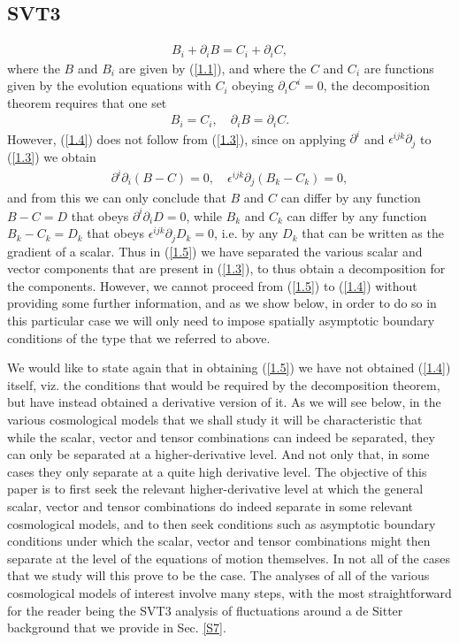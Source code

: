 \subsection{SVT3}
%
\begin{eqnarray}
B_i+\partial_iB=C_i+\partial_iC,
\label{1.3}
\end{eqnarray}
%
where the $B$ and $B_i$ are given by (\ref{1.1}), and where the $C$ and $C_i$ are functions given by the evolution equations with $C_i$ obeying  $\partial_iC^i=0$, the decomposition theorem requires that one set
%
\begin{eqnarray}
B_i= C_i,\quad \partial_iB=\partial_iC.
\label{1.4}
\end{eqnarray}
%
However, (\ref{1.4}) does not follow from (\ref{1.3}), since on applying $\partial^i$ and $\epsilon^{ijk}\partial_j$  to (\ref{1.3}) we obtain 
%
\begin{eqnarray}
\partial^i\partial_i(B-C)=0,\quad \epsilon^{ijk}\partial_j(B_k-C_k)=0,
\label{1.5}
\end{eqnarray}
%
and from this we can only conclude that $B$ and $C$ can differ by any function $B-C=D$ that obeys $\partial^i\partial_iD=0$, while $B_k$ and $C_k$ can differ by any function $B_k-C_k=D_k$ that obeys $\epsilon^{ijk}\partial_jD_k=0$, i.e. by any $D_k$ that can be written as the gradient of a scalar. Thus in (\ref{1.5}) we have separated the various scalar and vector components that are present in (\ref{1.3}), to thus obtain a decomposition for the components. However, we cannot proceed from (\ref{1.5}) to (\ref{1.4}) without providing some further information, and as we show below, in order to do so in this particular case we will only need to impose spatially asymptotic boundary conditions of the type that we referred to above.


We would like to state again that in obtaining (\ref{1.5}) we have not obtained (\ref{1.4}) itself, viz. the conditions that would be required by the decomposition theorem, but have instead obtained a derivative version of it. As we will see below, in the various cosmological models that we shall study it will be characteristic that while the scalar, vector and tensor combinations can indeed be separated, they can only be separated at a higher-derivative level. And not only that, in some cases they only separate at a quite high derivative level. The objective of this paper is to first seek the relevant higher-derivative level at which the general scalar, vector and tensor combinations do indeed separate in some relevant cosmological models, and to then seek conditions such as asymptotic boundary conditions under which the scalar, vector and tensor combinations might then separate at the level of the equations of motion themselves. In not all of the cases that we study will this prove to be the case. The analyses of all of the various cosmological models of interest involve many steps, with the most straightforward for the reader being the SVT3 analysis of fluctuations around a de Sitter background that we provide in Sec. \ref{S7}. 


